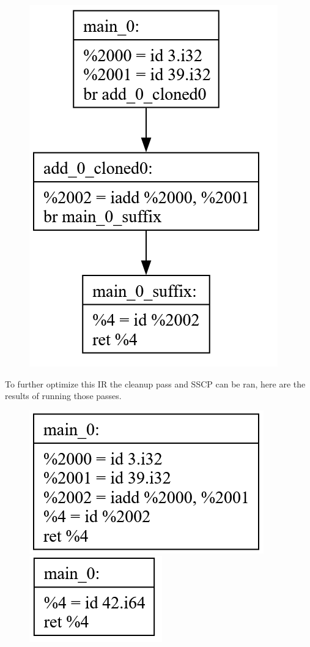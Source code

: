 \documentclass[11pt, a4paper, titlepage]{article}
\begin{document}
\begin{figure}[H]
  \centering
  \includegraphics[scale=0.3]{images/i29.png}
\end{figure}

To further optimize this IR the cleanup pass and SSCP can be ran, here are the results of running those passes.

\begin{figure}[H]
  \centering
  \includegraphics[scale=0.3]{images/i30.png}
  \includegraphics[scale=0.3]{images/i31.png}
\end{figure}
\end{document}
